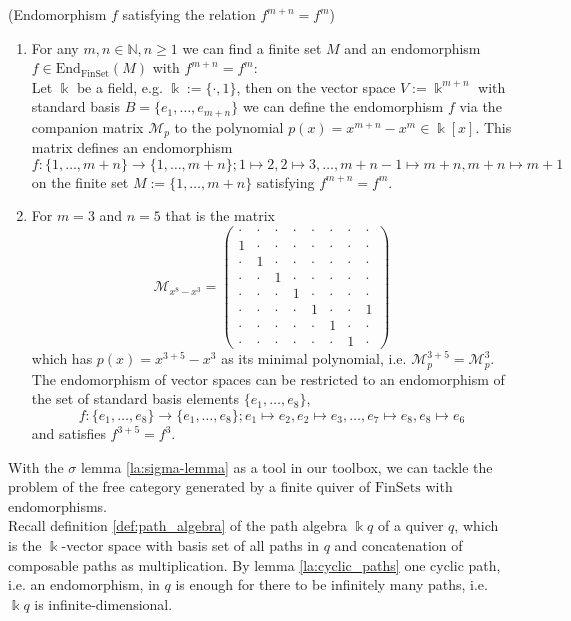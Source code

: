 \begin{example}{(Endomorphism $f$ satisfying the relation $f^{m+n} = f^{m}$)}
\begin{enumerate}
\renewcommand{\labelenumi}{(\theenumi)}
\item For any $m, n \in \mathbb{N}, n\geq 1$ we can find a finite set $M$ and an endomorphism $f \in \mathrm{End}_{\mathrm{FinSet}}(M)$
with $f^{m+n} = f^{m}$:\\
Let $\Bbbk$ be a field, e.g. $\Bbbk :=\{\cdot,1\}$, then on the vector space $V := \Bbbk^{m+n}$ with
standard basis $B = \{e_{1},\dots,e_{m+n}\}$ we can define the endomorphism $f$ via the companion matrix $\mathcal{M}_{p}$ to the polynomial
$p(x) = x^{m+n}-x^{m} \in \Bbbk[x]$. This matrix defines an endomorphism\\
$f : \{1,\dots,m+n\} \rightarrow \{1,\dots,m+n\}; 1 \mapsto 2, 2\mapsto 3, \dots, m+n-1 \mapsto m+n, m+n \mapsto m+1$
on the finite set $M := \{1,\dots,m+n\}$ satisfying $f^{m+n} = f^{m}$.
\item For $m = 3$ and $n = 5$ that is the matrix
\[
\mathcal{M}_{x^{8}-x^{3}} = \begin{pmatrix}
\cdot & \cdot & \cdot & \cdot & \cdot & \cdot & \cdot & \cdot \\
1 & \cdot & \cdot & \cdot & \cdot & \cdot & \cdot & \cdot \\
\cdot & 1 & \cdot & \cdot & \cdot & \cdot & \cdot & \cdot \\
\cdot & \cdot & 1 & \cdot & \cdot & \cdot & \cdot & \cdot \\
\cdot & \cdot & \cdot & 1 & \cdot & \cdot & \cdot & \cdot \\
\cdot & \cdot & \cdot & \cdot & 1 & \cdot & \cdot & 1 \\
\cdot & \cdot & \cdot & \cdot & \cdot & 1 & \cdot & \cdot \\
\cdot & \cdot & \cdot & \cdot & \cdot & \cdot & 1 & \cdot
\end{pmatrix}
\]
which has $p(x) = x^{3+5}-x^{3}$ as its minimal polynomial, i.e. $\mathcal{M}_{p}^{3+5} = \mathcal{M}_{p}^{3}$. The endomorphism of
vector spaces can be restricted to an endomorphism of the set of standard basis elements $\{e_{1},\dots,e_{8}\}$,
\[
f : \{e_{1},\dots,e_{8}\} \rightarrow \{e_{1},\dots,e_{8}\}; e_{1} \mapsto e_{2}, e_{2} \mapsto e_{3},\dots, e_{7} \mapsto e_{8}, e_{8}
\mapsto e_{6}
\]
and satisfies $f^{3+5} = f^{3}$.
\end{enumerate}
\end{example}

With the $\sigma$ lemma \ref{la:sigma-lemma} as a tool in our toolbox, we can tackle the problem of the free category generated by a finite
quiver of $\mathrm{FinSets}$ with endomorphisms.\\
Recall definition \ref{def:path_algebra} of the path algebra $\Bbbk q$ of a quiver $q$, which is the
$\Bbbk$-vector space with basis set of all paths in $q$ and concatenation of composable paths as multiplication. By lemma \ref{la:cyclic_paths} one cyclic
path, i.e. an endomorphism, in $q$ is enough for there to be infinitely many paths, i.e. $\Bbbk q$ is infinite-dimensional.

